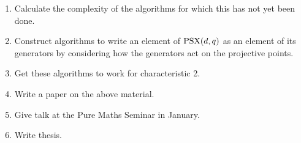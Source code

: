 \documentclass[12pt]{article}
\def\PSX{{\rm PSX}}
\begin{document}
\begin{enumerate}
\item Calculate the complexity of the algorithms for which this has not yet been done.

\item Construct algorithms to write an element of $\PSX(d, q)$ as an element of its generators by considering how the generators act on the projective points.

\item Get these algorithms to work for characteristic 2.

\item Write a paper on the above material.

\item Give talk at the Pure Maths Seminar in January.

\item Write thesis.

\end{enumerate}
\end{document}
